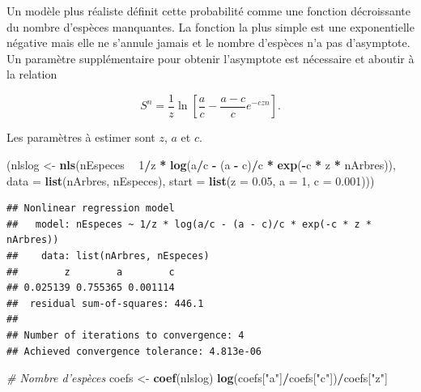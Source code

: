 \documentclass[
  11pt,
  french,
  a4paper,
  extrafontsizes,onecolumn,openright
  ]{memoir}
\newenvironment{Shaded}{\begin{snugshade}}{\end{snugshade}}
\newcommand{\CommentTok}[1]{\textcolor[rgb]{0.56,0.35,0.01}{\textit{#1}}}
\newcommand{\DataTypeTok}[1]{\textcolor[rgb]{0.13,0.29,0.53}{#1}}
\newcommand{\DecValTok}[1]{\textcolor[rgb]{0.00,0.00,0.81}{#1}}
\newcommand{\FloatTok}[1]{\textcolor[rgb]{0.00,0.00,0.81}{#1}}
\newcommand{\KeywordTok}[1]{\textcolor[rgb]{0.13,0.29,0.53}{\textbf{#1}}}
\newcommand{\NormalTok}[1]{#1}
\newcommand{\OperatorTok}[1]{\textcolor[rgb]{0.81,0.36,0.00}{\textbf{#1}}}
\newcommand{\StringTok}[1]{\textcolor[rgb]{0.31,0.60,0.02}{#1}}
\begin{document}
Un modèle plus réaliste définit cette probabilité comme une fonction décroissante du nombre d'espèces manquantes.
La fonction la plus simple est une exponentielle négative mais elle ne s'annule jamais et le nombre d'espèces n'a pas d'asymptote.
Un paramètre supplémentaire pour obtenir l'asymptote est nécessaire et aboutir à la relation

\begin{equation} 
  \label{eq:Soberon1993b}
  S^{n} = \frac{1}{z} \ln \left[ \frac{a}{c} - \frac{a-c}{c} e^{-czn} \right].
\end{equation}

Les paramètres à estimer sont \(z\), \(a\) et \(c\).

\scriptsize

\begin{Shaded}
\begin{Highlighting}[]
\NormalTok{(nlslog <-}\StringTok{ }\KeywordTok{nls}\NormalTok{(nEspeces }\OperatorTok{~}\StringTok{ }\DecValTok{1}\OperatorTok{/}\NormalTok{z }\OperatorTok{*}\StringTok{ }\KeywordTok{log}\NormalTok{(a}\OperatorTok{/}\NormalTok{c }\OperatorTok{-}\StringTok{ }\NormalTok{(a }\OperatorTok{-}\StringTok{ }\NormalTok{c)}\OperatorTok{/}\NormalTok{c }\OperatorTok{*}\StringTok{ }\KeywordTok{exp}\NormalTok{(}\OperatorTok{-}\NormalTok{c }\OperatorTok{*}\StringTok{ }
\StringTok{    }\NormalTok{z }\OperatorTok{*}\StringTok{ }\NormalTok{nArbres)), }\DataTypeTok{data =} \KeywordTok{list}\NormalTok{(nArbres, nEspeces), }\DataTypeTok{start =} \KeywordTok{list}\NormalTok{(}\DataTypeTok{z =} \FloatTok{0.05}\NormalTok{, }
    \DataTypeTok{a =} \DecValTok{1}\NormalTok{, }\DataTypeTok{c =} \FloatTok{0.001}\NormalTok{)))}
\end{Highlighting}
\end{Shaded}

\begin{verbatim}
## Nonlinear regression model
##   model: nEspeces ~ 1/z * log(a/c - (a - c)/c * exp(-c * z * nArbres))
##    data: list(nArbres, nEspeces)
##        z        a        c 
## 0.025139 0.755365 0.001114 
##  residual sum-of-squares: 446.1
## 
## Number of iterations to convergence: 4 
## Achieved convergence tolerance: 4.813e-06
\end{verbatim}

\begin{Shaded}
\begin{Highlighting}[]
\CommentTok{# Nombre d'espèces}
\NormalTok{coefs <-}\StringTok{ }\KeywordTok{coef}\NormalTok{(nlslog)}
\KeywordTok{log}\NormalTok{(coefs[}\StringTok{"a"}\NormalTok{]}\OperatorTok{/}\NormalTok{coefs[}\StringTok{"c"}\NormalTok{])}\OperatorTok{/}\NormalTok{coefs[}\StringTok{"z"}\NormalTok{]}
\end{Highlighting}
\end{Shaded}
\end{document}
